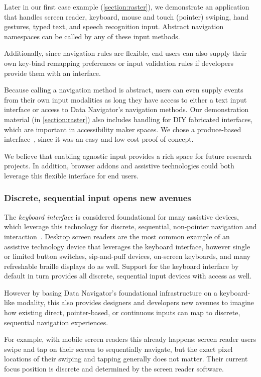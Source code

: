 \documentclass[journal]{vgtc}                %
\begin{document}
Later in our first case example (\autoref{section:raster}), we demonstrate an application that handles screen reader, keyboard, mouse and touch (pointer) swiping, hand gestures, typed text, and speech recognition input. Abstract navigation namespaces can be called by any of these input methods.

Additionally, since navigation rules are flexible, end users can also supply their own key-bind remapping preferences or input validation rules if developers provide them with an interface.

Because calling a navigation method is abstract, users can even supply events from their own input modalities as long they have access to either a text input interface or access to Data Navigator's navigation methods. Our demonstration material (in \autoref{section:raster}) also includes handling for DIY fabricated interfaces, which are important in accessibility maker spaces. We chose a produce-based interface~\cite{Rogers2014}, since it was an easy and low cost proof of concept.

We believe that enabling agnostic input provides a rich space for future research projects. In addition, browser addons and assistive technologies could both leverage this flexible interface for end users.

\subsubsection{Discrete, sequential input opens new avenues}
The \textit{keyboard interface} is considered foundational for many assistive devices, which leverage this technology for discrete, sequential, non-pointer navigation and interaction~\cite{WAI2017Keyboard}. Desktop screen readers are the most common example of an assistive technology device that leverages the keyboard interface, however single or limited button switches, sip-and-puff devices, on-screen keyboards, and many refreshable braille displays do as well. Support for the keyboard interface by default in turn provides all discrete, sequential input devices with access as well.

However by basing Data Navigator's foundational infrastructure on a keyboard-like modality, this also provides designers and developers new avenues to imagine how existing direct, pointer-based, or continuous inputs can map to discrete, sequential navigation experiences.

For example, with mobile screen readers this already happens: screen reader users swipe and tap on their screen to sequentially navigate, but the exact pixel locations of their swiping and tapping generally does not matter. Their current focus position is discrete and determined by the screen reader software.
\end{document}
